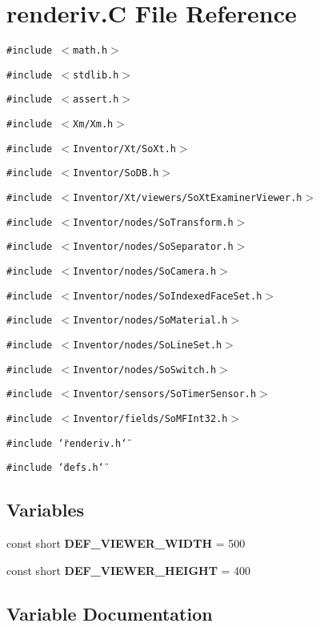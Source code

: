 \section{renderiv.C File Reference}
\label{renderiv_8C}
{\tt \#include $<$math.h$>$}\par
{\tt \#include $<$stdlib.h$>$}\par
{\tt \#include $<$assert.h$>$}\par
{\tt \#include $<$Xm/Xm.h$>$}\par
{\tt \#include $<$Inventor/Xt/So\-Xt.h$>$}\par
{\tt \#include $<$Inventor/So\-DB.h$>$}\par
{\tt \#include $<$Inventor/Xt/viewers/So\-Xt\-Examiner\-Viewer.h$>$}\par
{\tt \#include $<$Inventor/nodes/So\-Transform.h$>$}\par
{\tt \#include $<$Inventor/nodes/So\-Separator.h$>$}\par
{\tt \#include $<$Inventor/nodes/So\-Camera.h$>$}\par
{\tt \#include $<$Inventor/nodes/So\-Indexed\-Face\-Set.h$>$}\par
{\tt \#include $<$Inventor/nodes/So\-Material.h$>$}\par
{\tt \#include $<$Inventor/nodes/So\-Line\-Set.h$>$}\par
{\tt \#include $<$Inventor/nodes/So\-Switch.h$>$}\par
{\tt \#include $<$Inventor/sensors/So\-Timer\-Sensor.h$>$}\par
{\tt \#include $<$Inventor/fields/So\-MFInt32.h$>$}\par
{\tt \#include \char`\"{}renderiv.h\char`\"{}}\par
{\tt \#include \char`\"{}defs.h\char`\"{}}\par
\subsection*{Variables}
\begin{CompactItemize}
\item 
const short {\bf DEF\_\-VIEWER\_\-WIDTH} = 500
\item 
const short {\bf DEF\_\-VIEWER\_\-HEIGHT} = 400
\end{CompactItemize}


\subsection{Variable Documentation}
